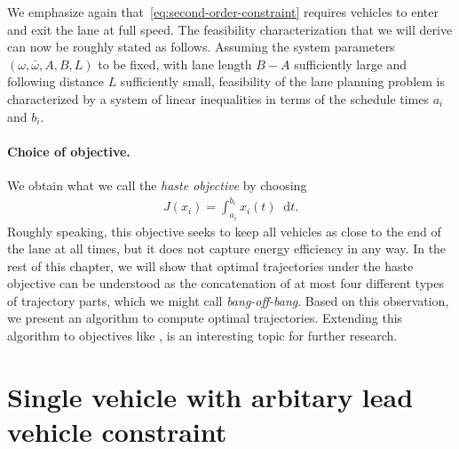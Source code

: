 \documentclass[a4paper]{article}
\theoremstyle{definition}
\theoremstyle{plain}
\newcommand*\diff{\mathop{}\!\mathrm{d}}
\begin{document}
We emphasize again that~\eqref{eq:second-order-constraint} requires vehicles to
enter and exit the lane at full speed.
%
The feasibility characterization that we will derive can now be roughly stated
as follows. Assuming the system parameters $(\omega, \bar{\omega},A,B,L)$ to be
fixed, with lane length $B-A$ sufficiently large and following distance $L$
sufficiently small, feasibility of the lane planning problem is characterized by
a system of linear inequalities in terms of the schedule times $a_{i}$ and
$b_{i}$.

\paragraph{Choice of objective.}
We obtain what we call the \emph{haste objective} by choosing
\begin{align}\label{eq:haste-objective}
  J(x_{i}) = \int_{a_{i}}^{b_{i}} x_{i}(t) \diff t .
\end{align}
%
Roughly speaking, this objective seeks to keep all vehicles as close to the end
of the lane at all times, but it does not capture energy efficiency in any way.
%
%
In the rest of this chapter, we will show that optimal trajectories under the
haste objective can be understood as the concatenation of at most four different
types of trajectory parts, which we might call \emph{bang-off-bang}. Based on
this observation, we present an algorithm to compute optimal trajectories.
%
Extending this algorithm to objectives like , is an
interesting topic for further research.



\section{Single vehicle with arbitary lead vehicle constraint}
\end{document}
